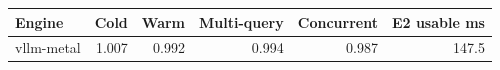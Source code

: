 \begin{tabular}{lrrrrr}
\toprule
Engine & Cold & Warm & Multi-query & Concurrent & E2 usable ms \\
\midrule
vllm-metal & 1.007 & 0.992 & 0.994 & 0.987 & 147.5 \\
\bottomrule
\end{tabular}
